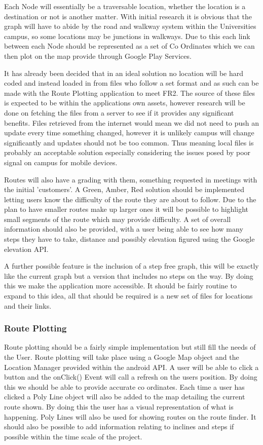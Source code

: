 \documentclass[10pt,a4paper]{article}
\begin{document}
Each Node will essentially be a traversable location, whether the location is a destination or not is another matter. With initial research it is obvious that the graph will have to abide by the road and walkway system within the Universities campus, so some locations may be junctions in walkways. Due to this each link between each Node should be represented as a set of Co Ordinates which we can then plot on the map provide through Google Play Services. 

It has already been decided that in an ideal solution no location will be hard coded and instead loaded in from files who follow a set format and as such can be made with the Route Plotting application to meet FR2. The source of these files is expected to be within the applications own assets, however research will be done on fetching the files from a server to see if it provides any significant benefits. Files retrieved from the internet would mean we did not need to push an update every time something changed, however it is unlikely campus will change significantly and updates should not be too common. Thus meaning local files is probably an acceptable solution especially considering the issues posed by poor signal on campus for mobile devices. 

Routes will also have a grading with them, something requested in meetings with the initial 'customers'. A Green, Amber, Red solution should be implemented letting users know the difficulty of the route they are about to follow. Due to the plan to have smaller routes make up larger ones it will be possible to highlight small segments of the route which may provide difficulty. A set of overall information should also be provided, with a user being able to see how many steps they have to take, distance and possibly elevation figured using the Google elevation API. 

A further possible feature is the inclusion of a step free graph, this will be exactly like the current graph but a version that includes no steps on the way. By doing this we make the application more accessible. It should be fairly routine to expand to this idea, all that should be required is a new set of files for locations and their links. 
\subsubsection{Route Plotting}
Route plotting should be a fairly simple implementation but still fill the needs of the User. Route plotting will take place using a Google Map object and the Location Manager provided within the android API. A user will be able to click a button and the onClick() Event will call a refresh on the users position. By doing this we should be able to provide accurate co ordinates. Each time a user has clicked a Poly Line object will also be added to the map detailing the current route shown. By doing this the user has a visual representation of what is happening. Poly Lines will also be used for showing routes on the route finder. It should also be possible to add information relating to inclines and steps if possible within the time scale of the project. 
\end{document}
